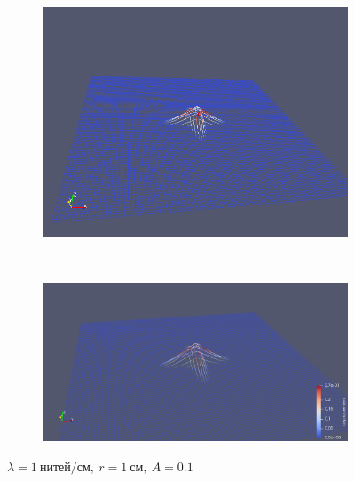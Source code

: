 \begin{figure}[H]
\begin{subfigure}[t]{0.5\textwidth}
        \includegraphics[width=\textwidth]{img/fiber/density_1_radius_1_amplitude_0.1/5.png}
    \end{subfigure}%
    ~
    \begin{subfigure}[t]{0.5\textwidth}
        \centering
        \includegraphics[width=\textwidth]{img/fiber/density_1_radius_1_amplitude_0.1/6.png}
    \end{subfigure}
    \caption{$\lambda=1~нитей/см,~r=1~см,~A=0.1$}
\end{figure}

